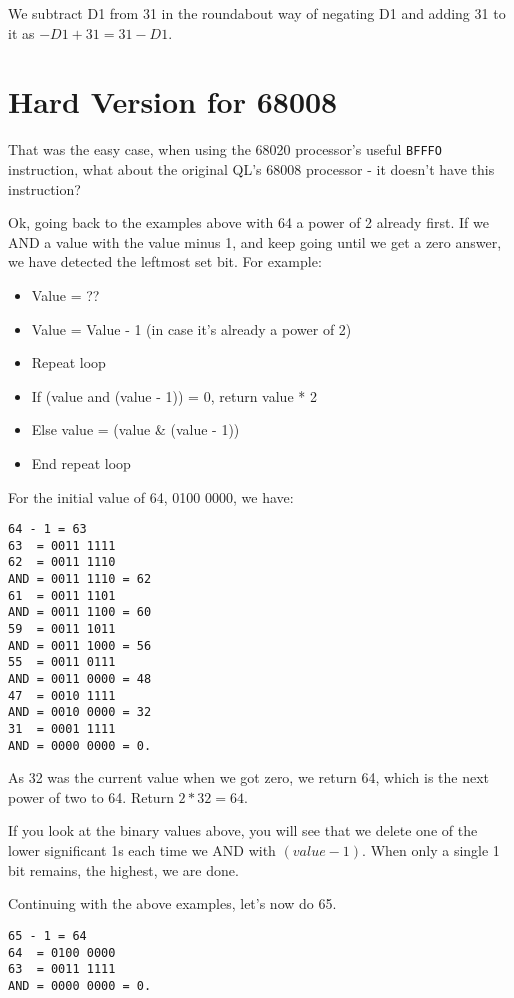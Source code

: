 We subtract D1 from 31 in the roundabout way of negating D1 and adding
31 to it as $-D1+31=31-D1$.

\section{Hard Version for 68008}

That was the easy case, when using the 68020 processor's useful \lstinline[basicstyle={\ttfamily},showstringspaces=false,tabsize=4]!BFFFO!
instruction, what about the original QL's 68008 processor - it doesn't
have this instruction?

Ok, going back to the examples above with 64 \textendash{} a power
of 2 already \textendash{} first. If we AND a value with the value
minus 1, and keep going until we get a zero answer, we have detected
the leftmost set bit. For example:
\begin{itemize}
\item Value = ??
\item Value = Value - 1 (in case it's already a power of 2)
\item Repeat loop
\item If (value and (value - 1)) = 0, return value {*} 2
\item Else value = (value \& (value - 1))
\item End repeat loop
\end{itemize}
For the initial value of 64, 0100 0000, we have:

\begin{lstlisting}[numbers=none]
64 - 1 = 63
63  = 0011 1111
62  = 0011 1110
AND = 0011 1110 = 62
61  = 0011 1101 
AND = 0011 1100 = 60
59  = 0011 1011
AND = 0011 1000 = 56
55  = 0011 0111
AND = 0011 0000 = 48
47  = 0010 1111
AND = 0010 0000 = 32
31  = 0001 1111 
AND = 0000 0000 = 0.
\end{lstlisting}

As 32 was the current value when we got zero, we return 64, which
is the next power of two to 64. Return $2*32=64$.

If you look at the binary values above, you will see that we delete
one of the lower significant 1s each time we AND with $(value-1)$.
When only a single 1 bit remains, the highest, we are done.

Continuing with the above examples, let's now do 65.

\begin{lstlisting}[showstringspaces=false,tabsize=4,numbers=none]
65 - 1 = 64
64  = 0100 0000
63  = 0011 1111
AND = 0000 0000 = 0.
\end{lstlisting}

